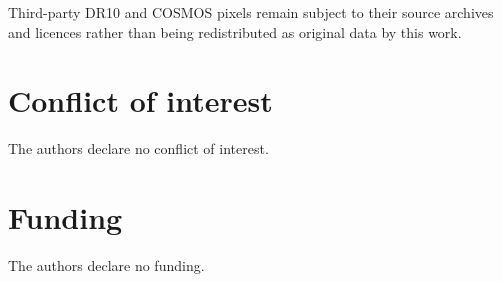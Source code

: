 Third-party DR10 and COSMOS pixels remain subject to their source archives and
licences rather than being redistributed as original data by this work.

\section*{Conflict of interest}

The authors declare no conflict of interest.

\section*{Funding}

The authors declare no funding.
